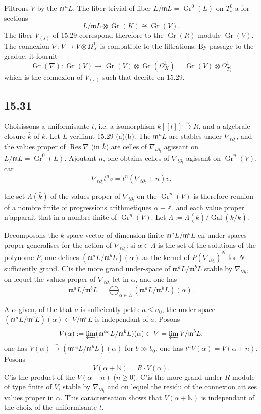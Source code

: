 \documentclass[12pt,a4paper]{article}
\theoremstyle{plain}
\theoremstyle{definition}
\theoremstyle{remark}
\DeclareMathOperator{\Gr}{Gr}
\DeclareMathOperator{\Res}{Res}
\DeclareMathOperator{\Gal}{Gal}
\newcommand{\bZ}{\mathbb{Z}}
\newcommand{\bN}{\mathbb{N}}
\begin{document}
Filtrons $V$ by the $\mathfrak{m}^n L$. The fiber trivial of fiber $L/\mathfrak{m}L = \Gr^0(L)$ on $T_s^0$ a for sections
\[
L/\mathfrak{m}L \otimes \Gr(K) \cong \Gr(V).
\]
The fiber $V_{(s)}$ of 15.29 correspond therefore to the $\Gr(R)$-module $\Gr(V)$. The connexion $\nabla: V \to V \otimes \Omega_X^1$ is compatible to the filtrations. By passage to the gradue, it fournit
\[
\Gr(\nabla): \Gr(V) \to \Gr(V) \otimes \Gr(\Omega_X^1) = \Gr(V) \otimes \Omega_{T_s^0}^1
\]
which is the connexion of $V_{(s)}$ such that decrite en 15.29.

\subsection*{15.31}

Choisissons a uniformisante $t$, i.e. a isomorphism $k[[t]] \xrightarrow{\sim} R$, and a algebraic closure $\bar{k}$ of $k$. Let $L$ verifiant 15.29 (a)(b). The $\mathfrak{m}^n L$ are stables under $\nabla_{t\partial_t}$, and the values proper of $\Res \nabla$ (in $\bar{k}$) are celles of $\nabla_{t\partial_t}$ agissant on $L/\mathfrak{m}L = \Gr^0(L)$. Ajoutant $n$, one obtains celles of $\nabla_{t\partial_t}$ agissant on $\Gr^n(V)$, car
\[
\nabla_{t\partial_t} t^n v = t^n(\nabla_{t\partial_t} + n)v.
\]

the set $\Lambda(\bar{k})$ of the values proper of $\nabla_{t\partial_t}$ on the $\Gr^n(V)$ is therefore reunion of a nombre finite of progressions arithmetiques $\alpha + \bZ$, and each value proper n'apparait that in a nombre finite of $\Gr^n(V)$. Let $\Lambda := \Lambda(\bar{k})/\Gal(\bar{k}/k)$.

Decomposons the $k$-space vector of dimension finite $\mathfrak{m}^a L/\mathfrak{m}^b L$ en under-spaces proper generalises for the action of $\nabla_{t\partial_t}$: si $\alpha \in \Lambda$ is the set of the solutions of the polynome $P$, one defines $(\mathfrak{m}^a L/\mathfrak{m}^b L)(\alpha)$ as the kernel of $P(\nabla_{t\partial_t})^N$ for $N$ sufficiently grand. C'is the more grand under-space of $\mathfrak{m}^a L/\mathfrak{m}^b L$ stable by $\nabla_{t\partial_t}$, on lequel the values proper of $\nabla_{t\partial_t}$ let in $\alpha$, and one has
\[
\mathfrak{m}^a L/\mathfrak{m}^b L = \bigoplus_{\alpha \in \Lambda} (\mathfrak{m}^a L/\mathfrak{m}^b L)(\alpha).
\]

A $\alpha$ given, of the that $a$ is sufficiently petit: $a \leqslant a_0$, the under-space $(\mathfrak{m}^a L/\mathfrak{m}^b L)(\alpha) \subset V/\mathfrak{m}^b L$ is independant of $a$. Posons
\[
V(\alpha) := \varprojlim (\mathfrak{m}^{a_0} L/\mathfrak{m}^b L)(\alpha) \subset V = \varprojlim V/\mathfrak{m}^b L.
\]
one has $V(\alpha) \xrightarrow{\sim} (\mathfrak{m}^{a_0} L/\mathfrak{m}^b L)(\alpha)$ for $b \gg b_0$. one has $t^n V(\alpha) = V(\alpha + n)$. Posons
\[
V(\alpha + \bN) = R \cdot V(\alpha).
\]
C'is the product of the $V(\alpha + n)$ ($n \geqslant 0$). C'is the more grand under-$R$-module of type finite of $V$, stable by $\nabla_{t\partial_t}$ and on lequel the residu of the connexion ait ses values proper in $\alpha$. This caracterisation shows that $V(\alpha + \bN)$ is independant of the choix of the uniformisante $t$.
\end{document}

